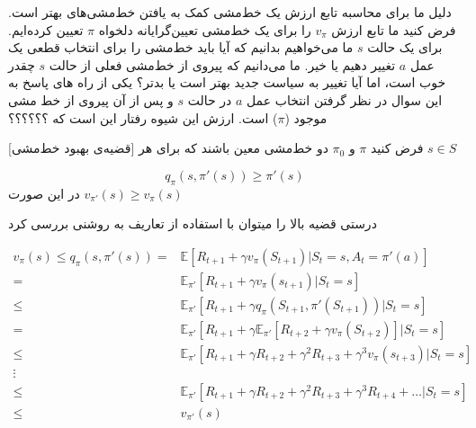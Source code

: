 % 
%


دلیل ما برای محاسبه تابع ارزش یک خط‌مشی کمک به یافتن خط‌مشی‌های بهتر است.
فرض کنید ما تابع ارزش 
$v_{\pi}$
 را برای یک خط‌مشی تعیین‌گرایانه دلخواه 
 $\pi$
  تعیین کرده‌ایم. برای یک حالت 
  $s$
 ما می‌خواهیم بدانیم که آیا باید خط‌مشی را برای انتخاب قطعی یک عمل 
 $a$
  تغییر دهیم یا خیر.
ما می‌دانیم که پیروی از خط‌مشی فعلی از حالت
 $s$
  چقدر خوب است، اما آیا تغییر به سیاست جدید بهتر است یا بدتر؟
  یکی از راه های پاسخ به این سوال در نظر گرفتن انتخاب عمل  $a$
در حالت 
$s$
و پس از آن پیروی از خط مشی موجود
($\pi$)
 است. 
 ارزش این شیوه رفتار این است که ؟؟؟؟؟؟



[قضیه‌ی بهبود خط‌مشی]
فرض کنید $\pi$ و 
$\pi_0$
دو خط‌مشی معین باشند که برای هر 
$s \in S$

$$q_\pi(s, \pi'(s)) \ge \pi'(s)$$
در این صورت 
$v_{\pi'}(s) \ge v_\pi(s)$

درستی قضیه بالا را می\nf توان با استفاده از تعاریف به روشنی بررسی کرد

\begin{align*}
v_\pi (s) \le q_\pi (s,\pi'(s)) = & \mathbb{E}\left[R_{t+1} + \gamma v_\pi(S_{t+1}) | S_t=s, A_t = \pi'(a)\right] \\
= & \mathbb{E}_{\pi'}\left[R_{t+1}+\gamma v_\pi(s_{t+1}) | S_t=s\right] \\
 \le &  \mathbb{E}_{\pi'}[R_{t+1}+ \gamma q_\pi(S_{t+1}, \pi'(S_{t+1})) | S_t=s] \\
= & \mathbb{E}_{\pi'}[R_{t+1} + \gamma \mathbb{E}_{\pi'}[R_{t+2} + \gamma v_\pi(S_{t+2})] | S_t=s] \\
\le & \mathbb{E}_{\pi'}[R_{t+1} + \gamma R_{t+2} + \gamma^2 R_{t+3} + \gamma^3 v_\pi(s_{t+3}) | S_t=s] \\
\vdots \\
\le & \mathbb{E}_{\pi'}[R_{t+1} + \gamma R_{t+2} + \gamma^2 R_{t+3} + \gamma^3 R_{t+4} + \dots | S_t=s] \\
\le & v_{\pi'}(s)
\end{align*}


